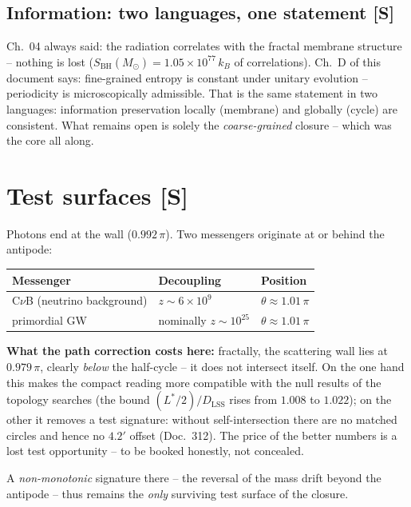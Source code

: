 \documentclass[11pt]{report}
\begin{document}
\section{Information: two languages, one statement [S]}

Ch.~04 always said: the radiation correlates with the fractal
membrane structure -- nothing is lost
($S_\text{BH}(M_\odot) = 1.05\times10^{77}\,k_B$ of
correlations). Ch.~D of this document says: fine-grained entropy
is constant under unitary evolution -- periodicity is
microscopically admissible. That is the same statement in two
languages: information preservation locally (membrane) and
globally (cycle) are consistent. What remains open is solely the
\emph{coarse-grained} closure -- which was the core all along.

\chapter{Test surfaces [S]}

Photons end at the wall ($0.992\,\pi$). Two messengers originate
at or behind the antipode:

\begin{center}
\begin{tabular}{lll}
\toprule
Messenger & Decoupling & Position \\
\midrule
C$\nu$B (neutrino background) & $z \sim 6\times10^{9}$ &
  $\theta \approx 1.01\,\pi$ \\
primordial GW & nominally $z \sim 10^{25}$ &
  $\theta \approx 1.01\,\pi$ \\
\bottomrule
\end{tabular}
\end{center}

\textbf{What the path correction costs here:} fractally, the
scattering wall lies at $0.979\,\pi$, clearly \emph{below} the
half-cycle -- it does not intersect itself. On the one hand this
makes the compact reading more compatible with the null results of
the topology searches (the bound $(L^{*}/2)/D_\text{LSS}$ rises
from $1.008$ to $1.022$); on the other it removes a test
signature: without self-intersection there are no matched circles
and hence no $4.2'$ offset (Doc.~312). The price of the better
numbers is a lost test opportunity -- to be booked honestly, not
concealed.

A \emph{non-monotonic} signature there -- the reversal of the mass
drift beyond the antipode -- thus remains the \emph{only}
surviving test surface of the closure.
\end{document}
